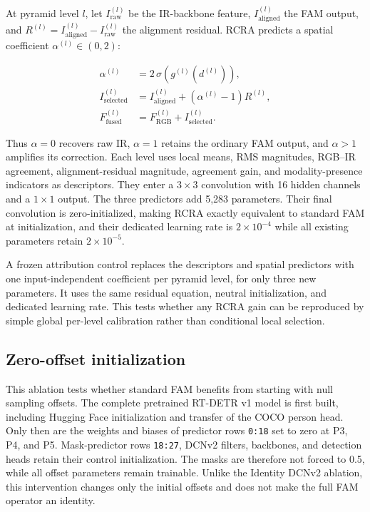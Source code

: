 At pyramid level \(l\), let \(I_{\mathrm{raw}}^{(l)}\) be the IR-backbone
feature, \(I_{\mathrm{aligned}}^{(l)}\) the FAM output, and
\(R^{(l)}=I_{\mathrm{aligned}}^{(l)}-I_{\mathrm{raw}}^{(l)}\) the alignment
residual. RCRA predicts a spatial coefficient
\(\alpha^{(l)}\in(0,2)\):

\begin{equation}
\begin{aligned}
  \alpha^{(l)} &= 2\,\sigma\!\left(g^{(l)}(d^{(l)})\right),\\
  I_{\mathrm{selected}}^{(l)}
    &= I_{\mathrm{aligned}}^{(l)}
       + \left(\alpha^{(l)}-1\right)R^{(l)},\\
  F_{\mathrm{fused}}^{(l)}
    &= F_{\mathrm{RGB}}^{(l)}+I_{\mathrm{selected}}^{(l)}.
\end{aligned}
\label{eq:rcra}
\end{equation}

Thus \(\alpha=0\) recovers raw IR, \(\alpha=1\) retains the ordinary FAM
output, and \(\alpha>1\) amplifies its correction. Each level uses local means,
RMS magnitudes, RGB--IR agreement, alignment-residual magnitude, agreement
gain, and modality-presence indicators as descriptors. They enter a
\(3\times3\) convolution with 16 hidden channels and a \(1\times1\) output.
The three predictors add 5,283 parameters. Their final convolution is
zero-initialized, making RCRA exactly equivalent to standard FAM at
initialization, and their dedicated learning rate is \(2\times10^{-4}\) while
all existing parameters retain \(2\times10^{-5}\).

A frozen attribution control replaces the descriptors and spatial predictors
with one input-independent coefficient per pyramid level, for only three new
parameters. It uses the same residual equation, neutral initialization, and
dedicated learning rate. This tests whether any RCRA gain can be reproduced by
simple global per-level calibration rather than conditional local selection.

\subsection{Zero-offset initialization}
\label{sec:zero-offset-method}

This ablation tests whether standard FAM benefits from starting with null
sampling offsets. The complete pretrained RT-DETR v1 model is first built,
including Hugging Face initialization and transfer of the COCO person head.
Only then are the weights and biases of predictor rows \texttt{0:18} set to
zero at P3, P4, and P5. Mask-predictor rows \texttt{18:27}, DCNv2 filters,
backbones, and detection heads retain their control initialization. The masks
are therefore not forced to 0.5, while all offset parameters remain trainable.
Unlike the Identity DCNv2 ablation, this intervention changes only the initial
offsets and does not make the full FAM operator an identity.

